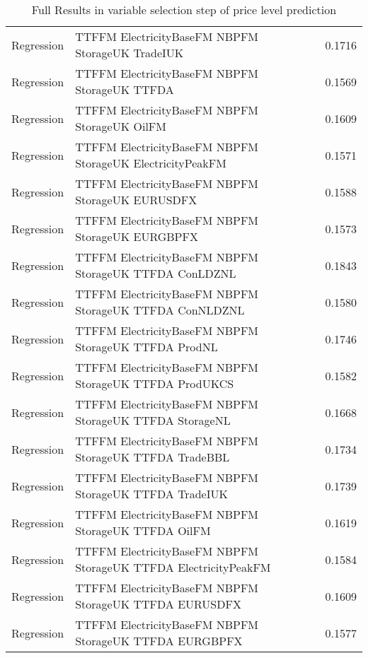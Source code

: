 \begin{table}[h!]
\begin{adjustbox}{max width=\textwidth}
\begin{tabular}{llr}
  Regression & TTFFM ElectricityBaseFM NBPFM StorageUK TradeIUK & 0.1716 \\ 
  Regression & TTFFM ElectricityBaseFM NBPFM StorageUK TTFDA & 0.1569 \\ 
  Regression & TTFFM ElectricityBaseFM NBPFM StorageUK OilFM & 0.1609 \\ 
  Regression & TTFFM ElectricityBaseFM NBPFM StorageUK ElectricityPeakFM & 0.1571 \\ 
  Regression & TTFFM ElectricityBaseFM NBPFM StorageUK EURUSDFX & 0.1588 \\ 
  Regression & TTFFM ElectricityBaseFM NBPFM StorageUK EURGBPFX & 0.1573 \\ 
  Regression & TTFFM ElectricityBaseFM NBPFM StorageUK TTFDA ConLDZNL & 0.1843 \\ 
  Regression & TTFFM ElectricityBaseFM NBPFM StorageUK TTFDA ConNLDZNL & 0.1580 \\ 
  Regression & TTFFM ElectricityBaseFM NBPFM StorageUK TTFDA ProdNL & 0.1746 \\ 
  Regression & TTFFM ElectricityBaseFM NBPFM StorageUK TTFDA ProdUKCS & 0.1582 \\ 
  Regression & TTFFM ElectricityBaseFM NBPFM StorageUK TTFDA StorageNL & 0.1668 \\ 
  Regression & TTFFM ElectricityBaseFM NBPFM StorageUK TTFDA TradeBBL & 0.1734 \\ 
  Regression & TTFFM ElectricityBaseFM NBPFM StorageUK TTFDA TradeIUK & 0.1739 \\ 
  Regression & TTFFM ElectricityBaseFM NBPFM StorageUK TTFDA OilFM & 0.1619 \\ 
  Regression & TTFFM ElectricityBaseFM NBPFM StorageUK TTFDA ElectricityPeakFM & 0.1584 \\ 
  Regression & TTFFM ElectricityBaseFM NBPFM StorageUK TTFDA EURUSDFX & 0.1609 \\ 
  Regression & TTFFM ElectricityBaseFM NBPFM StorageUK TTFDA EURGBPFX & 0.1577 \\ 
   \hline
 \end{tabular}
\end{adjustbox}
\caption{Full Results in variable selection step of price level prediction} 
\label{tab:level.var.selection.full}
\end{table}

